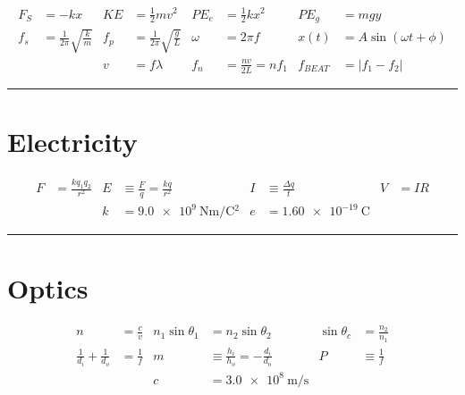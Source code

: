 \documentclass[10pt]{exam}
\begin{document}
\begin{align*}
  F_S &= -kx &
  KE &= \frac{1}{2}mv^2 &
  PE_e &= \frac{1}{2}kx^2&
  PE_g &= mgy \\
  f_s &=\frac{1}{2\pi}\sqrt{\frac{k}{m}} &
  f_p &=\frac{1}{2\pi}\sqrt{\frac{g}{L}} &
  \omega &= 2\pi f &
  x(t) &= A \sin\left(\omega t + \phi\right) \\
  && v &= f \lambda &
  f_n &= \frac{nv}{2L} = nf_1 &
  f_{BEAT} &= \left|f_1-f_2\right| %
\end{align*}

\hrule

\section*{Electricity}

\begin{align*}
  F &= \frac{kq_1 q_2} {r^2} &
  E &\equiv \frac{F}{q} = \frac{kq}{r^2} &
  I &\equiv \frac{\Delta q}{t} &
  V &= IR \\
  &&
  k &= \SI{9.0e9}{\newton\meter\per\coulomb^2} &
  e &= \SI{1.60e-19}{\coulomb}
\end{align*}

\hrule

\section*{Optics}

\begin{align*}
  n &= \frac{c}{v} &
  n_1 \sin\theta_1 &= n_2\sin\theta_2 &
  \sin\theta_c &= \frac{n_2}{n_1} \\
  \frac{1}{d_i} + \frac{1}{d_o} &= \frac{1}{f} &
  m &\equiv \frac{h_i}{h_o} = -\frac{d_i}{d_o} &
  P &\equiv \frac{1}{f} \\
  &&
  c &= \SI {3.0e8}{\meter\per\second}
\end{align*}
\end{document}
